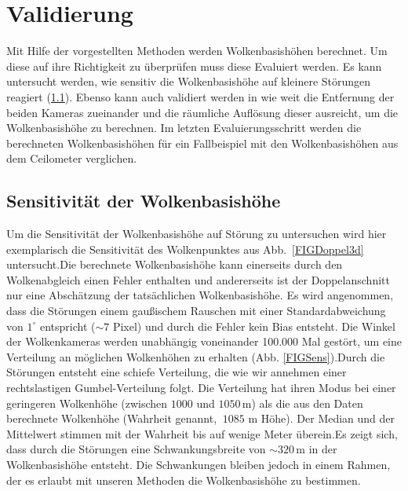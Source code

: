 \documentclass[a4paper,11pt,twoside,german]{article}
\newcommand{\absatz}{\smallbreak}
\begin{document}

\section{Validierung}
\label{SECValidation}
Mit Hilfe der vorgestellten Methoden werden Wolkenbasishöhen berechnet. Um diese
auf ihre Richtigkeit zu überprüfen muss diese Evaluiert werden. Es kann
untersucht werden, wie sensitiv die Wolkenbasishöhe auf kleinere Störungen
reagiert (\ref{SECSens}). Ebenso kann auch validiert werden in wie weit die
Entfernung der beiden Kameras zueinander und die räumliche Auflösung dieser
ausreicht, um die Wolkenbasishöhe zu berechnen. Im letzten Evaluierungsschritt
werden die berechneten Wolkenbasishöhen für ein Fallbeispiel mit den
Wolkenbasishöhen aus dem Ceilometer verglichen.

\subsection{Sensitivität der Wolkenbasishöhe}
\label{SECSens}
Um die Sensitivität der Wolkenbasishöhe auf Störung zu untersuchen wird hier
exemplarisch die Sensitivität des Wolkenpunktes aus Abb.~\ref{FIGDoppel3d}
untersucht.\absatz Die berechnete Wolkenbasishöhe kann einerseits durch den
Wolkenabgleich einen Fehler enthalten und andererseits ist der Doppelanschnitt
nur eine Abschätzung der tatsächlichen Wolkenbasishöhe. Es wird angenommen, dass
die Störungen einem gaußischem Rauschen mit einer Standardabweichung von
$1^{\circ}$ entspricht ($\sim7$ Pixel) und durch die Fehler kein Bias entsteht.
Die Winkel der Wolkenkameras werden unabhängig voneinander 100.000 Mal gestört,
um eine Verteilung an möglichen Wolkenhöhen zu erhalten (Abb.
\ref{FIGSens}).\absatz Durch die Störungen entsteht eine schiefe Verteilung, die
wie wir annehmen einer rechtslastigen Gumbel-Verteilung folgt. Die Verteilung
hat ihren Modus bei einer geringeren Wolkenhöhe (zwischen $1000$ und
$1050\,\mathrm{m}$) als die aus den Daten berechnete Wolkenhöhe (Wahrheit
genannt, $~1085$ m Höhe). Der Median und der Mittelwert stimmen mit der Wahrheit
bis auf wenige Meter überein.\absatz Es zeigt sich, dass durch die Störungen
eine Schwankungsbreite von $\sim320\,\mathrm{m}$ in der Wolkenbasishöhe
entsteht. Die Schwankungen bleiben jedoch in einem Rahmen, der es erlaubt mit
unseren Methoden die Wolkenbasishöhe zu bestimmen.
\end{document}
